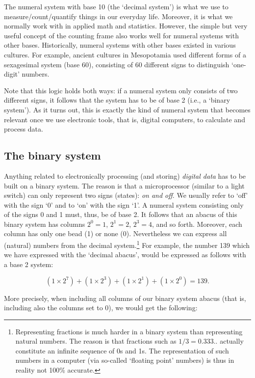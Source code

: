 \documentclass[
  12pt,
]{style/krantz}
\begin{document}
The numeral system with base 10 (the `decimal system') is what we use to measure/count/quantify things in our everyday life. Moreover, it is what we normally work with in applied math and statistics. However, the simple but very useful concept of the counting frame also works well for numeral systems with other bases. Historically, numeral systems with other bases existed in various cultures. For example, ancient cultures in Mesopotamia used different forms of a sexagesimal system (base 60), consisting of 60 different signs to distinguish `one-digit' numbers.

Note that this logic holds both ways: if a numeral system only consists of two different signs, it follows that the system has to be of base 2 (i.e., a `binary system'). As it turns out, this is exactly the kind of numeral system that becomes relevant once we use electronic tools, that is, digital computers, to calculate and process data.

\hypertarget{the-binary-system}{%
\subsection{The binary system}\label{the-binary-system}}

Anything related to electronically processing (and storing) \emph{digital data} has to be built on a binary system. The reason is that a microprocessor (similar to a light switch) can only represent two signs (states): \emph{on and off}. We usually refer to `off' with the sign `0' and to `on' with the sign `1'. A numeral system consisting only of the signs 0 and 1 must, thus, be of base 2. It follows that an abacus of this binary system has columns \(2^0=1\), \(2^1=2\), \(2^3=4\), and so forth. Moreover, each column has only one bead (1) or none (0). Nevertheless we can express all (natural) numbers from the decimal system.\footnote{Representing fractions is much harder in a binary system than representing natural numbers. The reason is that fractions such as \(1/3=0.333..\) actually constitute an infinite sequence of 0s and 1s. The representation of such numbers in a computer (via so-called `floating point' numbers) is thus in reality not 100\% accurate.} For example, the number 139 which we have expressed with the `decimal abacus', would be expressed as follows with a base 2 system:

\[(1 \times 2^7) + (1 \times 2^3) + (1 \times 2^1) + (1 \times 2^0) = 139.\]

More precisely, when including all columns of our binary system abacus (that is, including also the columns set to 0), we would get the following:
\end{document}
